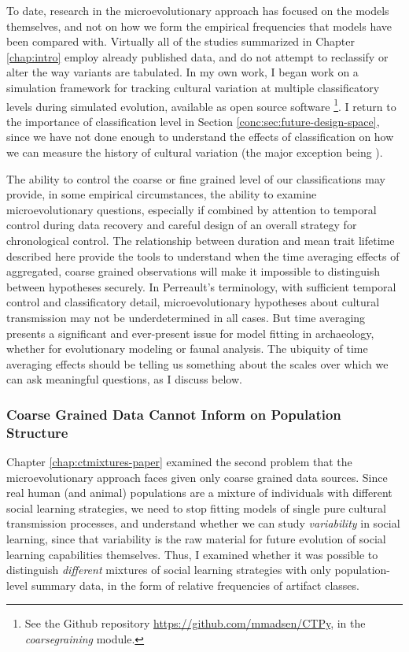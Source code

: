 To date, research in the microevolutionary approach has focused on the models themselves, and not on how we form the empirical frequencies that models have been compared with.  Virtually all of the studies summarized in Chapter \ref{chap:intro} employ already published data, and do not attempt to reclassify or alter the way variants are tabulated.  In my own work, I began work on a simulation framework for tracking cultural variation at multiple classificatory levels during simulated evolution, available as open source software \footnote{See the Github repository \url{https://github.com/mmadsen/CTPy}, in the \emph{coarsegraining} module.}.   I return to the importance of classification level in Section \ref{conc:sec:future-design-space}, since we have not done enough to understand the effects of classification on how we can measure the history of cultural variation (the major exception being \citealt{Lipo2001}). 

The ability to control the coarse or fine grained level of our classifications may provide, in some empirical circumstances, the ability to examine microevolutionary questions, especially if combined by attention to temporal control during data recovery and careful design of an overall strategy for chronological control.  The relationship between duration and mean trait lifetime described here provide the tools to understand when the time averaging effects of aggregated, coarse grained observations will make it impossible to distinguish between hypotheses securely.  In Perreault's \citeyearpar{perreault2019quality} terminology, with sufficient temporal control and classificatory detail, microevolutionary hypotheses about cultural transmission may not be underdetermined in all cases.  But time averaging presents a significant and ever-present issue for model fitting in archaeology, whether for evolutionary modeling or faunal analysis.  The ubiquity of time averaging effects should be telling us something about the scales over which we can ask meaningful questions, as I discuss below.

\subsubsection{Coarse Grained Data Cannot Inform on Population Structure}\label{conc:sec:conc-ctmixtures}

Chapter \ref{chap:ctmixtures-paper} examined the second problem that the microevolutionary approach faces given only coarse grained data sources.  Since real human (and animal) populations are a mixture of individuals with different social learning strategies, we need to stop fitting models of single pure cultural transmission processes, and understand whether we can study \emph{variability} in social learning, since that variability is the raw material for future evolution of social learning capabilities themselves.  Thus, I examined whether it was possible to distinguish \emph{different} mixtures of social learning strategies with only population-level summary data, in the form of relative frequencies of artifact classes.

